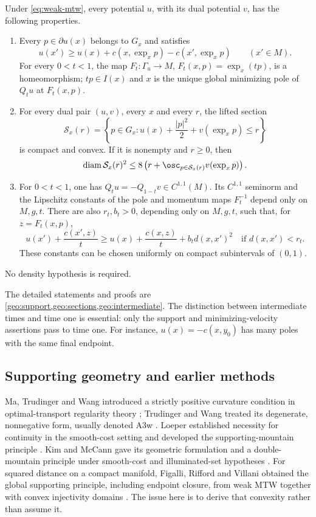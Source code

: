 \begin{theorem}
\label{thm:foundation}
Under \eqref{eq:weak-mtw}, every potential $u$, with its dual potential $v$,
has the following properties.
\begin{enumerate}[label=\textup{(\roman*)}]
\item Every $p\in\partial u(x)$ belongs to $G_x$ and satisfies
\[
 u(x')\geq u(x)+c(x,\exp_xp)-c(x',\exp_xp)
 \qquad(x'\in M).
\]
For every $0<t<1$, the map $F_t:\Gamma_u\to M$,
$F_t(x,p)=\exp_x(tp)$, is a homeomorphism; $tp\in I(x)$ and $x$
is the unique global minimizing pole of $Q_tu$ at $F_t(x,p)$.
\item For every dual pair $(u,v)$, every $x$ and every $r$, the lifted section
\[
 \mathcal S_x(r)=\left\{p\in G_x:
 u(x)+\frac{|p|^2}{2}+v(\exp_xp)\leq r\right\}
\]
is compact and convex. If it is nonempty and $r\geq0$, then
\[
 \operatorname{diam}\mathcal S_x(r)^2
 \leq8\left(r+\osc_{p\in\mathcal S_x(r)}v(\exp_xp)\right).
\]
\item For $0<t<1$, one has $Q_tu=-Q_{1-t}v\in C^{1,1}(M)$.
Its $C^{1,1}$ seminorm and the Lipschitz constants of the pole and momentum
maps $F_t^{-1}$ depend only on $M,g,t$. There are also $r_t,b_t>0$,
depending only on $M,g,t$, such that, for $z=F_t(x,p)$,
\[
 u(x')+\frac{c(x',z)}t
 \geq u(x)+\frac{c(x,z)}t+b_t d(x,x')^2
 \quad\text{if }d(x,x')<r_t.
\]
These constants can be chosen uniformly on compact subintervals of $(0,1)$.
\end{enumerate}
No density hypothesis is required.
\end{theorem}

The detailed statements and proofs are \cref{geo:support,geo:sections,geo:intermediate}.
The distinction between intermediate times and time one is essential:
only the support and minimizing-velocity assertions pass to time one.
For instance, $u(x)=-c(x,y_0)$ has many poles with the same final endpoint.

\subsection{Supporting geometry and earlier methods}

Ma, Trudinger and Wang introduced a strictly positive curvature condition
in optimal-transport regularity theory \cite{MTW2005}; Trudinger and Wang
treated its degenerate, nonnegative form, usually denoted A3w
\cite[Section~1]{TW2009}. Loeper established necessity for continuity in
the smooth-cost setting and developed the supporting-mountain principle
\cite{Loeper2009}. Kim and McCann gave its geometric formulation and a
double-mountain principle under smooth-cost and illuminated-set
hypotheses \cite[Theorem~4.10]{KM2010}. For squared distance on a compact
manifold, Figalli, Rifford and Villani obtained the global supporting
principle, including endpoint closure, from weak MTW together with convex
injectivity domains \cite[Lemma~3.1]{FRV2011}. The issue here is to derive
that convexity rather than assume it.

